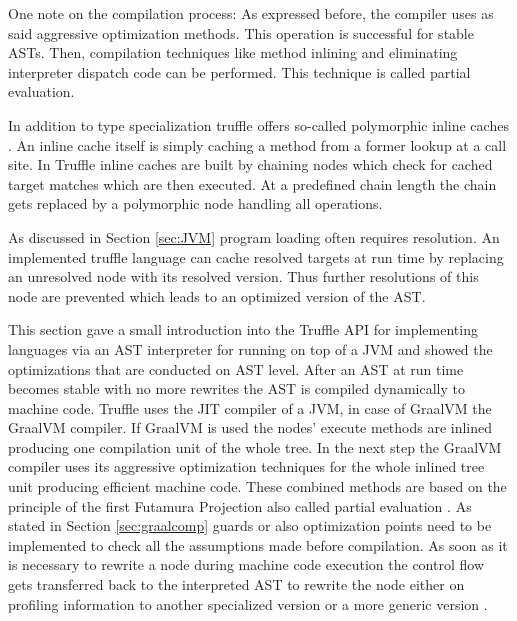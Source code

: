 One note on the compilation process: As expressed before, the compiler uses as said aggressive optimization methods. This operation is successful for stable ASTs. Then, compilation techniques like method inlining and eliminating interpreter dispatch code can be performed. This technique is called partial evaluation.

In addition to type specialization truffle offers so-called polymorphic inline caches \cite{ChambOpti}. An inline cache itself is simply caching a method from a former lookup at a call site. In Truffle inline caches are built by chaining nodes which check for cached target matches which are then executed. At a predefined chain length the chain gets replaced by a polymorphic node handling all operations.

As discussed in Section \ref{sec:JVM} program loading often requires resolution. An implemented truffle language can cache resolved targets at run time by replacing an unresolved node with its resolved version. Thus further resolutions of this node are prevented which leads to an optimized version of the AST.

This section gave a small introduction into the Truffle API for implementing languages via an AST interpreter for running on top of a JVM and showed the optimizations that are conducted on AST level. After an AST at run time becomes stable with no more rewrites the AST is compiled dynamically to machine code. Truffle uses the JIT compiler of a JVM, in case of GraalVM the GraalVM compiler. If GraalVM is used the nodes' execute methods are inlined producing one compilation unit of the whole tree. In the next step the GraalVM compiler uses its aggressive optimization techniques for the whole inlined tree unit producing efficient machine code. These combined methods are based on the principle of the first Futamura Projection also called partial evaluation \cite{FutaPart}. As stated in Section \ref{sec:graalcomp} guards or also optimization points need to be implemented to check all the assumptions made before compilation. As soon as it is necessary to rewrite a node during machine code execution the control flow gets transferred back to the interpreted AST to rewrite the node either on profiling information to another specialized version or a more generic version \cite{ChambDeopt}.

